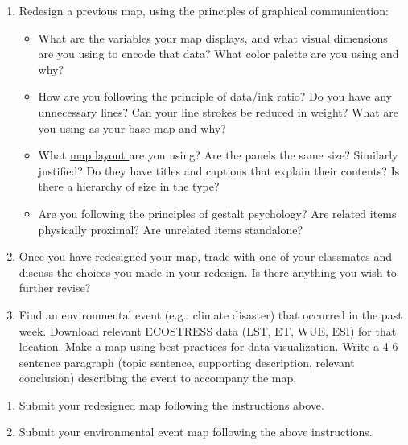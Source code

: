 \documentclass[oneside,a4paper,11pt,explicit]{book}
\begin{document}
\begin{enumerate}
    \item Redesign a previous map, using the principles of graphical communication:
	\begin{itemize}
		\item What are the variables your map displays, and what visual dimensions are you using to encode that data? What color palette are you using and why?
		\item How are you following the principle of data/ink ratio? Do you have any unnecessary lines? Can your line strokes be reduced in weight? What are you using as your base map and why?
		\item What \href{https://en.wikipedia.org/wiki/Map_layout}{map layout }are you using? Are the panels the same size? Similarly justified? Do they have titles and captions that explain their contents? Is there a hierarchy of size in the type?
		\item Are you following the principles of gestalt psychology? Are related items physically proximal? Are unrelated items standalone?
        \end{itemize}
    \item Once you have redesigned your map, trade with one of your classmates and discuss the choices you made in your redesign. Is there anything you wish to further revise? 
    \item Find an environmental event (e.g., climate disaster) that occurred in the past week. Download relevant ECOSTRESS data (LST, ET, WUE, ESI) for that location. Make a map using best practices for data visualization. Write a 4-6 sentence paragraph (topic sentence, supporting description, relevant conclusion) describing the event to accompany the map.
\end{enumerate}

\begin{tcolorbox}[colback=yellow!5!white,colframe=IceCreamOrbit,title= \vspace{.2em} \Large Map of the Week Assignments]
	\large
	\begin{enumerate}
		\item Submit your redesigned map following the instructions above. 
		\item Submit your environmental event map following the above instructions. 
	\end{enumerate}
\end{tcolorbox}
\end{document}
